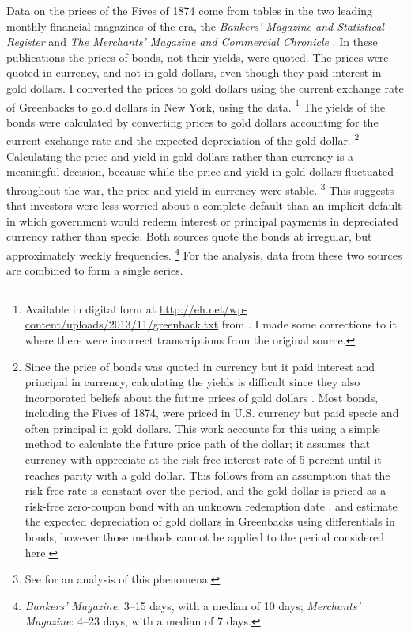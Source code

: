 Data on the prices of the Fives of 1874 come from tables in the two leading monthly financial magazines of the era, the \textit{Bankers' Magazine and Statistical Register} and \textit{The Merchants' Magazine and Commercial Chronicle} \parencites[186]{Mitchell1903}.
In these publications the prices of bonds, not their yields, were quoted.
The prices were quoted in currency, and not in gold dollars, even though they paid interest in gold dollars.
I converted the prices to gold dollars using the current exchange rate of Greenbacks to gold dollars in New York, using the \textcite{Mitchell1908} data.%
\footnote{
  Available in digital form at \url{http://eh.net/wp-content/uploads/2013/11/greenback.txt} from \textcite{WillardGuinnaneEtAl1996}.
  I made some corrections to it where there were incorrect transcriptions from the original source.
}
The yields of the bonds were calculated by converting prices to gold dollars accounting for the current exchange rate and the expected depreciation of the gold dollar.%
\footnote{
  Since the price of bonds was quoted in currency but it paid interest and principal in currency, calculating the yields is difficult since they also incorporated beliefs about the future prices of gold dollars \parencites[Appendix A]{Macaulay1938}{Roll1972}{Calomiris1988}[302-303]{HomerSylla2005}.
  Most bonds, including the Fives of 1874, were priced in U.S. currency but paid specie and often principal in gold dollars.
  This work accounts for this using a simple method to calculate the future price path of the dollar; it assumes that currency with appreciate at the risk free interest rate of 5 percent until it reaches parity with a gold dollar.
  This follows from an assumption that the risk free rate is constant over the period, and the gold dollar is priced as a risk-free zero-coupon bond with an unknown redemption date \cite{McCandless1996}.
  \textcite{Roll1972} and \textcite{Calomiris1988} estimate the expected depreciation of gold dollars in Greenbacks using differentials in bonds, however those methods cannot be applied to the period considered here.
}
Calculating the price and yield in gold dollars rather than currency is a meaningful decision, because while the price and yield in gold dollars fluctuated throughout the war, the price and yield in currency were stable.%
\footnote{See \textcite{Roll1972} for an analysis of this phenomena.}
This suggests that investors were less worried about a complete default than an implicit default in which government would redeem interest or principal payments in depreciated currency rather than specie.
Both sources quote the bonds at irregular, but approximately weekly frequencies.
\footnote{\textit{Bankers' Magazine}: 3--15 days, with a median of 10 days; \textit{Merchants' Magazine}: 4--23 days, with a median of 7 days.}
For the analysis, data from these two sources are combined to form a single series.

